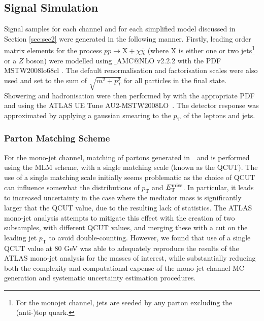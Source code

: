 \subsection{Signal Simulation}
\label{signal_generation}
Signal samples for each channel and for each simplified model discussed in Section \ref{sec:sec2} were generated in the following manner. Firstly, leading order matrix elements for the process $pp \rightarrow \mathrm{X} + \chi\bar{\chi}$ (where X is either one or two jets\footnote{For the monojet channel, jets are seeded by any parton excluding the (anti-)top quark.} or a $Z$ boson) were modelled using \MG$\_${\footnotesize A}MC$@$NLO v2.2.2 \cite{MG_aMCNLO2014} with the PDF MSTW2008lo68cl \cite{MSTW}. The default renormalisation and factorisation scales were also used and set to the sum of $\sqrt{m^{2} + p_{T}^{2}}$ for all particles in the final state. Showering and hadronisation were then performed by  with the appropriate PDF and using the ATLAS UE Tune AU2-MSTW2008LO~\cite{AUtune}. The detector response was approximated by applying a gaussian smearing to the $p_{\mathrm{T}}$ of the leptons and jets.

\subsubsection{Parton Matching Scheme}
\label{matching_procedure}
For the mono-jet channel, matching of partons generated in \MG$\mbox{ }$and \PYTHIA is performed using the MLM scheme, with a single matching scale (known as the QCUT). The use of a single matching scale initially seems problematic as the choice of QCUT can influence somewhat the distributions of $p_{\mathrm{T}}$ and $E_{\mathrm{T}}^{\mathrm{miss}}$. In particular, it leads to increased uncertainty in the case where the mediator mass is significantly larger that the QCUT value, due to the resulting lack of statistics. The ATLAS mono-jet analysis attempts to mitigate this effect with the creation of two subsamples, with different QCUT values, and merging these with a cut on the leading jet $p_{\mathrm{T}}$ to avoid double-counting. However, we found that use of a single QCUT value at 80 GeV was able to adequately reproduce the results of the ATLAS mono-jet analysis for the masses of interest, while substantially reducing both the complexity and computational expense of the mono-jet channel MC generation and systematic uncertainty estimation procedures. 

